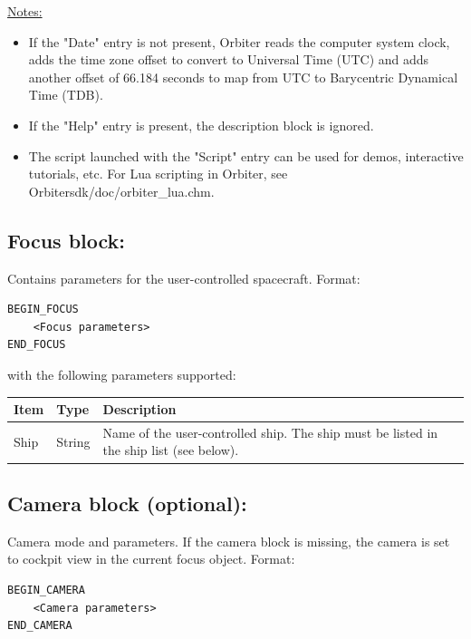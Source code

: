 \documentclass[Orbiter Developer Manual.tex]{subfiles}
\begin{document}
\noindent
\underline{Notes:}

\begin{itemize}
\item If the "Date" entry is not present, Orbiter reads the computer system clock, adds the time zone offset to convert to Universal Time (UTC) and adds another offset of 66.184 seconds to map from UTC to Barycentric Dynamical Time (TDB).
\item If the "Help" entry is present, the description block is ignored.
\item The script launched with the "Script" entry can be used for demos, interactive tutorials, etc. For Lua scripting in Orbiter, see Orbitersdk/doc/orbiter\_lua.chm.
\end{itemize}


\subsection*{Focus block:}
Contains parameters for the user-controlled spacecraft. Format:

\begin{lstlisting}[language=OSFS]
BEGIN_FOCUS
	<Focus parameters>
END_FOCUS
\end{lstlisting}

\noindent
with the following parameters supported:

\begin{table}[H]
	\centering
	\begin{tabularx}{\textwidth}{ |l|l|X| }
	\hline\rule{0pt}{2ex}
	\textbf{Item} & \textbf{Type} & \textbf{Description}\\
	\hline\rule{0pt}{2ex}
	Ship & String & Name of the user-controlled ship. The ship must be listed in the ship list (see below).\\
	\hline
	\end{tabularx}
\end{table}

\subsection*{Camera block (optional):}

Camera mode and parameters. If the camera block is missing, the camera is set to cockpit view in the current focus object. Format:

\begin{lstlisting}[language=OSFS]
BEGIN_CAMERA
	<Camera parameters>
END_CAMERA
\end{lstlisting}
\end{document}
